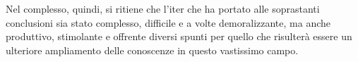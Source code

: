 \documentclass[12pt,a4paper,openright,oneside]{report}
\renewcommand{\chaptermark}[1]{\markboth{\thechapter.\ #1}{}}
\begin{document}
Nel complesso, quindi, si ritiene che l'iter che ha portato alle soprastanti conclusioni sia stato complesso, difficile e a volte demoralizzante, ma anche produttivo, stimolante e offrente diversi spunti per quello che risulterà essere un ulteriore ampliamento delle conoscenze in questo vastissimo campo.


\renewcommand{\chaptermark}[1]{\markright{\thechapter \ #1}{}}
\lhead[\fancyplain{}{\bfseries\thepage}]{\fancyplain{}{\bfseries\rightmark}}

\printbibliography[keyword={article},title={Bibliografia}]
\printbibliography[keyword={online},title={Sitografia}]

%
%
\end{document}
